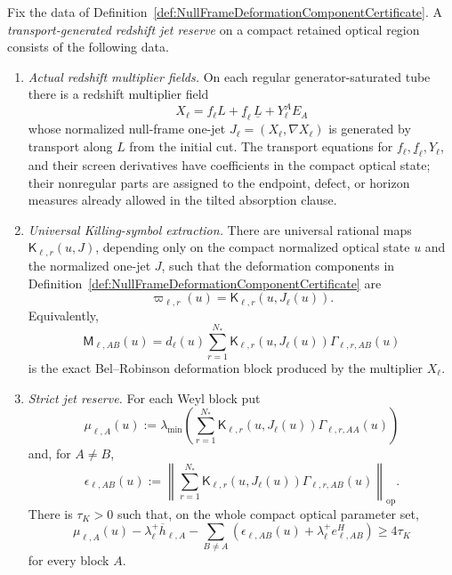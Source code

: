 \begin{definition}\label{def:TransportGeneratedRedshiftJetReserve}
Fix the data of Definition~\ref{def:NullFrameDeformationComponentCertificate}.
A \emph{transport-generated redshift jet reserve} on a compact retained optical
region consists of the following data.
\begin{enumerate}
    \item \emph{Actual redshift multiplier fields.}  On each regular
    generator-saturated tube there is a redshift multiplier field
    \[
        X_\ell
        =
        f_\ell L+\underline f_\ell\,\underline L+Y_\ell^AE_A
    \]
    whose normalized null-frame one-jet
    $J_\ell=(X_\ell,\nabla X_\ell)$ is generated by transport along $L$ from
    the initial cut.  The transport equations for
    $f_\ell,\underline f_\ell,Y_\ell$, and their screen derivatives have
    coefficients in the compact optical state; their nonregular parts are
    assigned to the endpoint, defect, or horizon measures already allowed in
    the tilted absorption clause.

    \item \emph{Universal Killing-symbol extraction.}  There are universal
    rational maps $\mathsf K_{\ell,r}(u,J)$, depending only on the compact
    normalized optical state $u$ and the normalized one-jet $J$, such that the
    deformation components in
    Definition~\ref{def:NullFrameDeformationComponentCertificate} are
    \[
        \varpi_{\ell,r}(u)=\mathsf K_{\ell,r}(u,J_\ell(u)).
    \]
    Equivalently,
    \[
        \mathsf M_{\ell,AB}(u)
        =
        d_\ell(u)
        \sum_{r=1}^{N_*}
        \mathsf K_{\ell,r}(u,J_\ell(u))\Gamma_{\ell,r,AB}(u)
    \]
    is the exact Bel--Robinson deformation block produced by the multiplier
    $X_\ell$.

    \item \emph{Strict jet reserve.}  For each Weyl block put
    \[
        \mu_{\ell,A}(u)
        :=
        \lambda_{\min}
        \left(
        \sum_{r=1}^{N_*}
        \mathsf K_{\ell,r}(u,J_\ell(u))\Gamma_{\ell,r,AA}(u)
        \right)
    \]
    and, for $A\ne B$,
    \[
        \epsilon_{\ell,AB}(u)
        :=
        \left\|
        \sum_{r=1}^{N_*}
        \mathsf K_{\ell,r}(u,J_\ell(u))\Gamma_{\ell,r,AB}(u)
        \right\|_{\mathrm{op}} .
    \]
    There is $\tau_K>0$ such that, on the whole compact optical parameter set,
    \[
        \mu_{\ell,A}(u)
        -
        \lambda_\ell^+\overline h_{\ell,A}
        -
        \sum_{B\ne A}
        \left(
            \epsilon_{\ell,AB}(u)
            +
            \lambda_\ell^+ e^H_{\ell,AB}
        \right)
        \ge
        4\tau_K
    \]
    for every block $A$.


\end{enumerate}
\end{definition}
